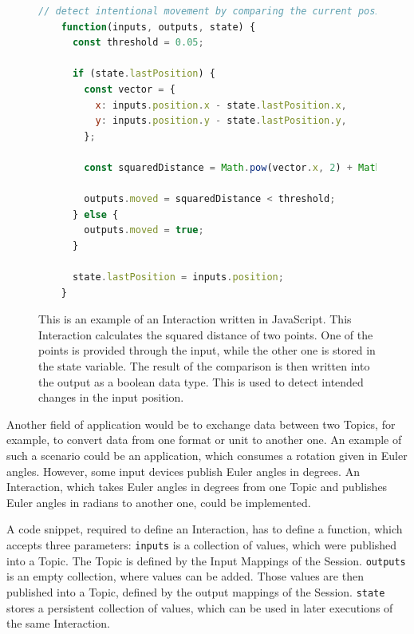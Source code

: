 \begin{figure}[H]
	\begin{lstlisting}[language=JavaScript]
    // detect intentional movement by comparing the current position with a previous one
    function(inputs, outputs, state) {
      const threshold = 0.05;

      if (state.lastPosition) {
        const vector = {
          x: inputs.position.x - state.lastPosition.x,
          y: inputs.position.y - state.lastPosition.y,
        };

        const squaredDistance = Math.pow(vector.x, 2) + Math.pow(vector.y, 2);

        outputs.moved = squaredDistance < threshold;
      } else {
        outputs.moved = true;
      }

      state.lastPosition = inputs.position;
    }
  \end{lstlisting}
	\caption[A UBII Interaction in JavaScript]{This is an example of an Interaction written in JavaScript. This Interaction calculates the squared distance of two points. One of the points is provided through the input, while the other one is stored in the state variable. The result of the comparison is then written into the output as a boolean data type. This is used to detect intended changes in the input position.}\label{fig:ubii-interaction-example}
\end{figure}

Another field of application would be to exchange data between two Topics, for example, to convert data from one format or unit to another one. An example of such a scenario could be an application, which consumes a rotation given in Euler angles. %
However, some input devices publish Euler angles in degrees. An Interaction, which takes Euler angles in degrees from one Topic and publishes Euler angles in radians to another one, could be implemented.

A code snippet, required to define an Interaction, has to define a function, which accepts three parameters:
\lstinline{inputs} is a collection of values, which were published into a Topic. The Topic is defined by the Input Mappings of the Session. \lstinline{outputs} is an empty collection, where values can be added. Those values are then published into a Topic, defined by the output mappings of the Session. \lstinline{state} stores a persistent collection of values, which can be used in later executions of the same Interaction.